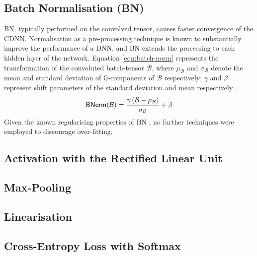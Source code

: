 \documentclass[journal]{IEEEtran}
\DeclareMathOperator\batchnorm{\mathsf{BNorm}}
\begin{document}
\subsection{Batch Normalisation (BN)}
BN, typically performed on the convolved tensor, causes faster convergence of
the CDNN\footnotemark. Normalisation as a pre-processing technique is known to
substantially improve the performance of a DNN, and BN extends the processing to
each hidden layer of the network. Equation \eqref{eqn:batch-norm} represents the
transformation of the convoluted batch-tensor $\mathcal{B}$, where
$\mu_\mathcal{B}$ and $\sigma_\mathcal{B}$ denote the mean and standard
deviation of $\mathbb{Q}$-components of $\mathcal{B}$ respectively; $\gamma$ and
$\beta$ represent shift parameters of the standard deviation and mean
respectively \cite{Laarhoven:2017}.
\begin{equation}
    \batchnorm(\mathcal{B}) = \frac{%
        \gamma\left(\mathcal{B}-\mu_\mathcal{B}\right)}
    {\sigma_\mathcal{B}} + \beta \label{eqn:batch-norm}
\end{equation}
Given the known regularising properties of BN \cite{Luo:2019}, no further
techniques were employed to discourage over-fitting.

\subsection{Activation with the Rectified Linear Unit}
\subsection{Max-Pooling}
\subsection{Linearisation}
\subsection{Cross-Entropy Loss with Softmax}
\end{document}
